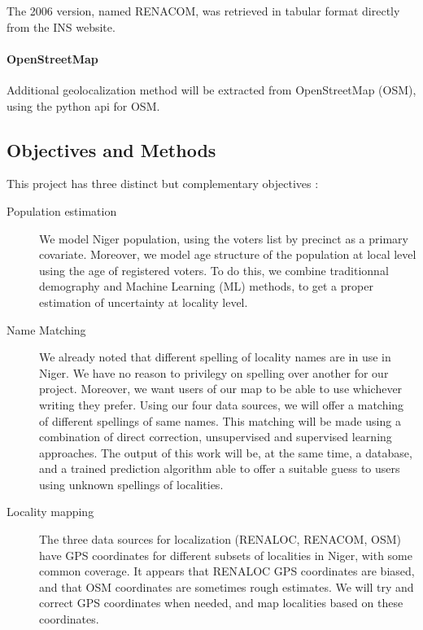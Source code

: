 \documentclass[12pt]{article}\usepackage[]{graphicx}\usepackage[]{color}
\begin{document}
The 2006 version, named RENACOM, was retrieved in tabular format directly from the INS website.

\paragraph{OpenStreetMap} Additional geolocalization method will be extracted from OpenStreetMap (OSM), using the python api for OSM.

\subsection{Objectives and Methods}

This project has three distinct but complementary objectives :
\begin{description}
	\item[Population estimation] We model Niger population, using the voters list by precinct as a primary covariate. Moreover, we model age structure of the population at local level using the age of registered voters. To do this, we combine traditionnal demography and Machine Learning (ML) methods, to get a proper estimation of uncertainty at locality level.
	\item[Name Matching] We already noted that different spelling of locality names are in use in Niger. We have no reason to privilegy on spelling over another for our project. Moreover, we want users of our map to be able to use whichever writing they prefer. Using our four data sources, we will offer a matching of different spellings of same names. This matching will be made using a combination of direct correction, unsupervised and supervised learning approaches. The output of this work will be, at the same time, a database, and a trained prediction algorithm able to offer a suitable guess to users using unknown spellings of localities.
	\item[Locality mapping] The three data sources for localization (RENALOC, RENACOM, OSM) have GPS coordinates for different subsets of localities in Niger, with some common coverage. It appears that RENALOC GPS coordinates are biased, and that OSM coordinates are sometimes rough estimates. We will try and correct GPS coordinates when needed, and map localities based on these coordinates.
\end{description}
\end{document}
